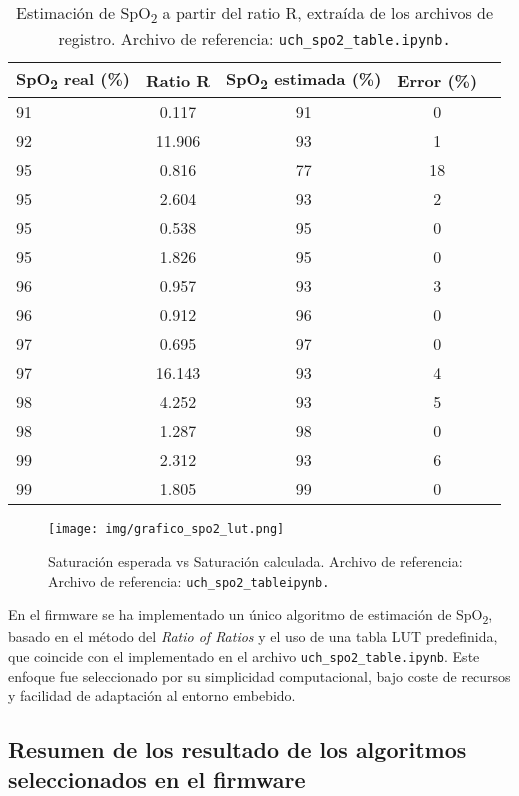 \begin{table}[H]
\centering
\begin{tabular}{|l|c|c|c|c|}
\hline
\textbf{SpO\textsubscript{2} real (\%)} & \textbf{Ratio R} & \textbf{SpO\textsubscript{2} estimada (\%)} & \textbf{Error (\%)} \\
\hline
91 & 0.117 & 91 & 0 \\
\hline
92 & 11.906 & 93 & 1 \\
\hline
95 & 0.816 & 77 & 18 \\
\hline
95 & 2.604 & 93 & 2 \\
\hline
95 & 0.538 & 95 & 0 \\
\hline
95 & 1.826 & 95 & 0 \\
\hline
96 & 0.957 & 93 & 3 \\
\hline
96 & 0.912 & 96 & 0 \\
\hline
97 & 0.695 & 97 & 0 \\
\hline
97 & 16.143 & 93 & 4 \\
\hline
98 & 4.252 & 93 & 5 \\
\hline
98 & 1.287 & 98 & 0 \\
\hline
99 & 2.312 & 93 & 6 \\
\hline
99 & 1.805 & 99 & 0 \\
\hline
\end{tabular}
\caption{Estimación de SpO\textsubscript{2} a partir del ratio R, extraída de los archivos de registro. Archivo de referencia: \texttt{uch\_spo2\_table.ipynb.}}
\label{tabla:spo2_ratio_r}
\end{table}

\begin{figure}[H]
    \centering
    \texttt{[image: img/grafico\_spo2\_lut.png]}
    \caption{Saturación esperada vs Saturación calculada. Archivo de referencia: Archivo de referencia: \texttt{uch\_spo2\_tableipynb.}}
    \label{fig:grafico_spo2_lut}
\end{figure}

En el firmware se ha implementado un único algoritmo de estimación de SpO\textsubscript{2}, basado en el método del \textit{Ratio of Ratios} y el uso de una tabla LUT predefinida, que coincide con el implementado en el archivo \texttt{uch\_spo2\_table.ipynb}. Este enfoque fue seleccionado por su simplicidad computacional, bajo coste de recursos y facilidad de adaptación al entorno embebido.



\subsection{Resumen de los resultado de los algoritmos seleccionados en el firmware}

